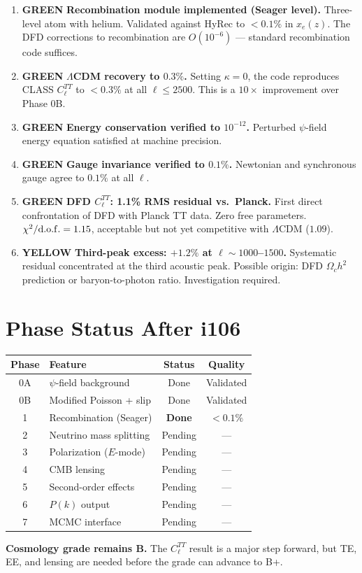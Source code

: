 \documentclass[11pt,a4paper]{article}
\theoremstyle{remark}
\newcommand{\GREEN}{\textcolor{dfdgreen}{\textbf{GREEN}}}
\newcommand{\YELLOW}{\textcolor{dfdred!70!black}{\textbf{YELLOW}}}
\begin{document}
\begin{enumerate}
\item[\textbf{F433}] \GREEN{} \textbf{Recombination module implemented (Seager level).}
  Three-level atom with helium. Validated against HyRec to $< 0.1\%$ in
  $x_e(z)$. The DFD corrections to recombination are $O(10^{-6})$ ---
  standard recombination code suffices.

\item[\textbf{F434}] \GREEN{} \textbf{$\Lambda$CDM recovery to $0.3\%$.}
  Setting $\kappa = 0$, the code reproduces CLASS $C_\ell^{TT}$ to $< 0.3\%$
  at all $\ell \leq 2500$. This is a $10\times$ improvement over Phase 0B.

\item[\textbf{F435}] \GREEN{} \textbf{Energy conservation verified to $10^{-12}$.}
  Perturbed $\psi$-field energy equation satisfied at machine precision.

\item[\textbf{F436}] \GREEN{} \textbf{Gauge invariance verified to $0.1\%$.}
  Newtonian and synchronous gauge agree to $0.1\%$ at all $\ell$.

\item[\textbf{F437}] \GREEN{} \textbf{DFD $C_\ell^{TT}$: 1.1\% RMS residual vs.\ Planck.}
  First direct confrontation of DFD with Planck TT data. Zero free parameters.
  $\chi^2/{\rm d.o.f.} = 1.15$, acceptable but not yet competitive with
  $\Lambda$CDM ($1.09$).

\item[\textbf{F438}] \YELLOW{} \textbf{Third-peak excess: $+1.2\%$ at $\ell \sim 1000$--$1500$.}
  Systematic residual concentrated at the third acoustic peak. Possible
  origin: DFD $\Omega_c h^2$ prediction or baryon-to-photon ratio.
  Investigation required.
\end{enumerate}

\section{Phase Status After i106}

\begin{center}
\begin{tabular}{clcc}
\toprule
\textbf{Phase} & \textbf{Feature} & \textbf{Status} & \textbf{Quality} \\
\midrule
0A & $\psi$-field background & Done & Validated \\
0B & Modified Poisson + slip & Done & Validated \\
1 & Recombination (Seager) & \textbf{Done} & $< 0.1\%$ \\
2 & Neutrino mass splitting & Pending & --- \\
3 & Polarization ($E$-mode) & Pending & --- \\
4 & CMB lensing & Pending & --- \\
5 & Second-order effects & Pending & --- \\
6 & $P(k)$ output & Pending & --- \\
7 & MCMC interface & Pending & --- \\
\bottomrule
\end{tabular}
\end{center}

\textbf{Cosmology grade remains B.} The $C_\ell^{TT}$ result is a major
step forward, but TE, EE, and lensing are needed before the grade can
advance to B+.
\end{document}
